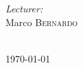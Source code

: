 \documentclass[11pt, a4paper, titlepage, block]{article}
\begin{document}
\begin{titlepage}
		\begin{minipage}{\textwidth}
			\begin{flushright}
				\emph{Lecturer:} \\
				Marco \textsc{Bernardo}\\ %
			\end{flushright}
		\end{minipage}\\[5cm]

		{\today}\\[1cm]


		
		\newpage
		\tableofcontents
		\newpage
		
	\end{titlepage}
	
\end{document}
